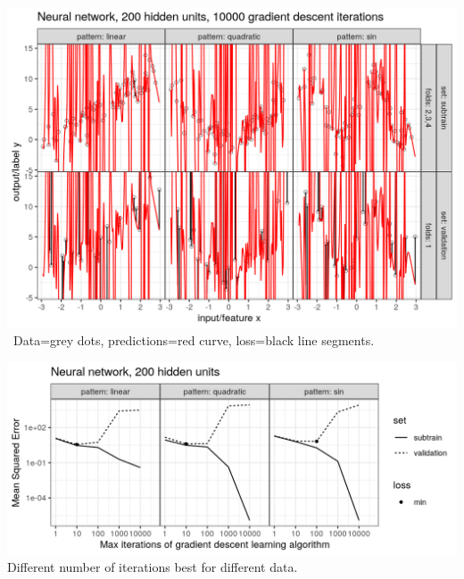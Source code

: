 \begin{frame}
  \includegraphics[width=\textwidth]{figure-overfitting-pred-units=200-maxit=10000.png}
\ Data=grey dots, predictions=red curve, loss=black line segments.

\end{frame}


\begin{frame}
  \includegraphics[width=\textwidth]{figure-overfitting-data-loss-200.png}
Different number of iterations best for different data.
\end{frame}

